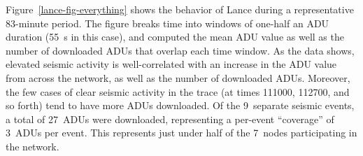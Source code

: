 Figure~\ref{lance-fig-everything} shows the behavior of Lance during a
representative 83-minute period. The figure breaks time into windows of
one-half an ADU duration (55~s in this case), and computed the mean ADU value
as well as the number of downloaded ADUs that overlap each time window. As
the data shows, elevated seismic activity is well-correlated with an increase
in the ADU value from across the network, as well as the number of downloaded
ADUs. Moreover, the few cases of clear seismic activity in the trace (at
times 111000, 112700, and so forth) tend to have more ADUs downloaded. Of the
9~separate seismic events, a total of 27~ADUs were downloaded, representing a
per-event ``coverage'' of 3~ADUs per event. This represents just under half
of the 7~nodes participating in the network.
